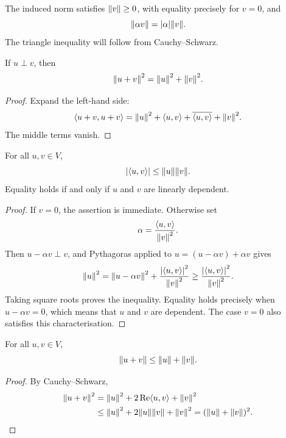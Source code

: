 The induced norm satisfies $\norm{v}\ge0$, with equality precisely for $v=0$, and
\begin{equation*}
\norm{\alpha v}=\abs{\alpha}\norm{v}.
\end{equation*}
The triangle inequality will follow from Cauchy--Schwarz.

\begin{Theorem}[Pythagoras]\label{thm:Pythagoras}
If $u\perp v$, then
\begin{equation*}
\norm{u+v}^2=\norm{u}^2+\norm{v}^2.
\end{equation*}
\end{Theorem}
\begin{proof}
Expand the left-hand side:
\begin{equation*}
\langle u+v,u+v\rangle=\norm{u}^2+\langle u,v\rangle+\overline{\langle u,v\rangle}+\norm{v}^2.
\end{equation*}
The middle terms vanish.
\end{proof}

\begin{Theorem}\label{thm:CauchySchwarz}
For all $u,v\in V$,
\begin{equation*}
\abs{\langle u,v\rangle}\le\norm{u}\norm{v}.
\end{equation*}
Equality holds if and only if $u$ and $v$ are linearly dependent.
\end{Theorem}
\begin{proof}
If $v=0$, the assertion is immediate. Otherwise set
\begin{equation*}
\alpha=\frac{\langle u,v\rangle}{\norm{v}^2}.
\end{equation*}
Then $u-\alpha v\perp v$, and Pythagoras applied to $u=(u-\alpha v)+\alpha v$ gives
\begin{equation*}
\norm{u}^2=\norm{u-\alpha v}^2+\frac{\abs{\langle u,v\rangle}^2}{\norm{v}^2}\ge\frac{\abs{\langle u,v\rangle}^2}{\norm{v}^2}.
\end{equation*}
Taking square roots proves the inequality. Equality holds precisely when $u-\alpha v=0$, which means that $u$ and $v$ are dependent. The case $v=0$ also satisfies this characterisation.
\end{proof}

\begin{Corollary}
For all $u,v\in V$,
\begin{equation*}
\norm{u+v}\le\norm{u}+\norm{v}.
\end{equation*}
\end{Corollary}
\begin{proof}
By Cauchy--Schwarz,
\begin{align*}
\norm{u+v}^2&=\norm{u}^2+2\operatorname{Re}\langle u,v\rangle+\norm{v}^2\\
&\le\norm{u}^2+2\norm{u}\norm{v}+\norm{v}^2=(\norm{u}+\norm{v})^2.
\end{align*}
\end{proof}

